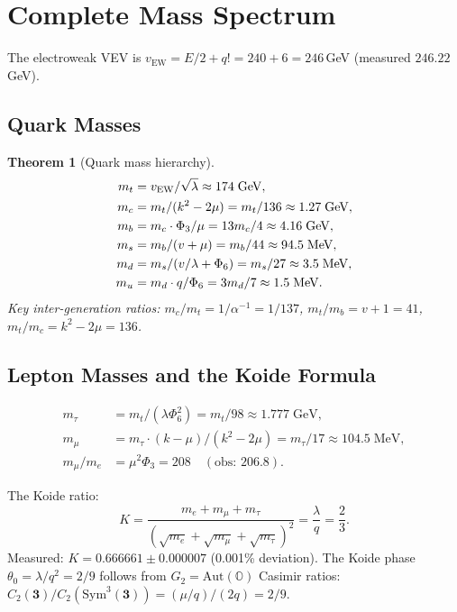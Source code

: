 \documentclass[12pt,a4paper]{article}
\newtheorem{theorem}{Theorem}[section]
\begin{document}
\section{Complete Mass Spectrum}
\label{sec:massspectrum}

The electroweak VEV is $v_{\mathrm{EW}} = E/2 + q! = 240+6 = 246$\,GeV
(measured $246.22$\,GeV).

\subsection{Quark Masses}

\begin{theorem}[Quark mass hierarchy]\label{thm:quarks}
\begin{align}
  m_t &= v_{\mathrm{EW}}/\sqrt{\lambda} \approx 174\;\mathrm{GeV},\notag\\
  m_c &= m_t/(k^2-2\mu) = m_t/136 \approx 1.27\;\mathrm{GeV},\notag\\
  m_b &= m_c\cdot\Phi_3/\mu = 13m_c/4 \approx 4.16\;\mathrm{GeV},\notag\\
  m_s &= m_b/(v+\mu) = m_b/44 \approx 94.5\;\mathrm{MeV},\label{eq:quarkmasses}\\
  m_d &= m_s/(v/\lambda+\Phi_6) = m_s/27 \approx 3.5\;\mathrm{MeV},\notag\\
  m_u &= m_d\cdot q/\Phi_6 = 3m_d/7 \approx 1.5\;\mathrm{MeV}.\notag
\end{align}
Key inter-generation ratios:
$m_c/m_t = 1/\alpha^{-1} = 1/137$, \;
$m_t/m_b = v+1 = 41$, \;
$m_t/m_c = k^2-2\mu = 136$.
\end{theorem}

\subsection{Lepton Masses and the Koide Formula}

\begin{align}
  m_\tau &= m_t/(\lambda\Phi_6^2) = m_t/98 \approx 1.777\;\mathrm{GeV},
  \label{eq:mtau}\\
  m_\mu &= m_\tau\cdot(k-\mu)/(k^2-2\mu) = m_\tau/17 \approx 104.5\;\mathrm{MeV},
  \label{eq:mmu}\\
  m_\mu/m_e &= \mu^2\Phi_3 = 208\quad(\text{obs: }206.8). \label{eq:mmuoverme}
\end{align}

The Koide ratio:
\begin{equation}\label{eq:koide-main}
  K = \frac{m_e+m_\mu+m_\tau}{(\sqrt{m_e}+\sqrt{m_\mu}+\sqrt{m_\tau})^2}
    = \frac{\lambda}{q} = \frac{2}{3}.
\end{equation}
Measured: $K=0.666661\pm 0.000007$ (0.001\% deviation).
The Koide phase $\theta_0 = \lambda/q^2 = 2/9$ follows from $G_2 = \mathrm{Aut}(\mathbb{O})$
Casimir ratios: $C_2(\mathbf{3})/C_2(\mathrm{Sym}^3(\mathbf{3})) = (\mu/q)/(2q) = 2/9$.
\end{document}
